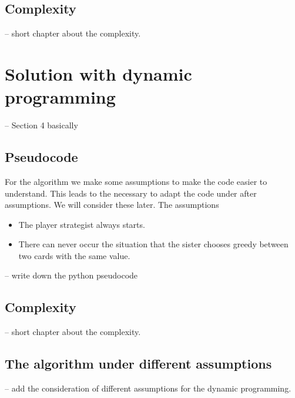 \documentclass[a4paper,12pt]{article}
\begin{document}
\subsection{Complexity}
-- short chapter about the complexity.




\newpage


\section{Solution with dynamic programming}
-- Section 4 basically


\subsection{Pseudocode}
For the algorithm we make some assumptions to make the code
easier to understand. This leads to the necessary to adapt
the code under after assumptions. We will consider these later.
The assumptions
\begin{itemize}
	\item The player strategist always starts.
	\item There can never occur the situation that the sister chooses greedy between two cards with the same value.
\end{itemize}

-- write down the python pseudocode



\subsection{Complexity}
-- short chapter about the complexity.

\subsection{The algorithm under different assumptions}
-- add the consideration of different assumptions for the dynamic programming.
\end{document}
